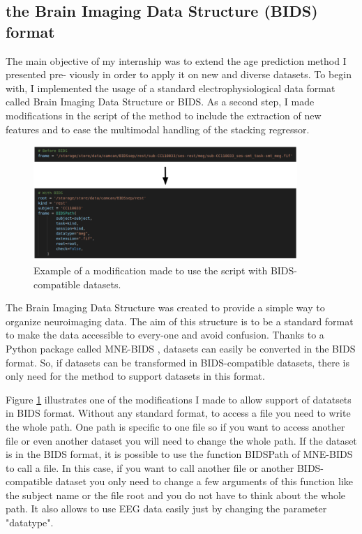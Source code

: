 \subsection{the Brain Imaging Data Structure (BIDS) format}

The main objective of my internship was to extend the age prediction method I presented pre-
viously in order to apply it on new and diverse datasets. To begin with, I implemented the usage
of a standard electrophysiological data format called Brain Imaging Data Structure or BIDS. As
a second step, I made modifications in the script of the method to include the extraction of new
features and to ease the multimodal handling of the stacking regressor.

\begin{figure}[ht]
    \centering
    \includegraphics[width=10cm]{images_report/bids_example.png}
    \caption{Example of a modification made to use the script with BIDS-compatible datasets.}
    \label{bids_example}
\end{figure}

The Brain Imaging Data Structure was created to provide a simple way to organize neuroimaging data. The aim of this structure is to be a standard format to make the data accessible to every-one and avoid confusion. Thanks to a Python package called MNE-BIDS \cite{appelhoff2019mne}, datasets can easily be converted in the BIDS format. So, if datasets can be transformed in BIDS-compatible datasets, there is only need for the method to support datasets in this format.

Figure \ref{bids_example} illustrates one of the modifications I made to allow support of datatsets in BIDS format. Without any standard format, to access a file you need to write the whole path. One path is specific to one file so if you want to access another file or even another dataset you will need to change the whole path. If the dataset is in the BIDS format, it is possible to use the function BIDSPath of MNE-BIDS to call a file. In this case, if you want to call another file or another BIDS-compatible dataset you only need to change a few arguments of this function like the subject name or the file root and you do not have to think about the whole path. It also allows to use EEG data easily just by changing the parameter "datatype".

